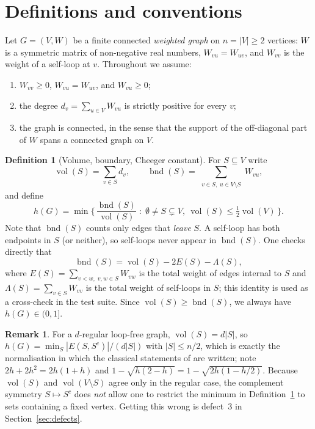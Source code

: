 \documentclass[11pt,a4paper]{article}
\theoremstyle{plain}
\theoremstyle{definition}
\newtheorem{definition}[theorem]{Definition}
\newtheorem{remark}[theorem]{Remark}
\DeclareMathOperator{\vol}{vol}
\DeclareMathOperator{\bnd}{bnd}
\begin{document}
\section{Definitions and conventions}\label{sec:defs}

Let $G=(V,W)$ be a finite connected \emph{weighted graph} on $n=|V|\ge 2$
vertices: $W$ is a symmetric matrix of non-negative real numbers, $W_{vu}=W_{uv}$,
and $W_{vv}$ is the weight of a self-loop at $v$.  Throughout we assume:

\begin{enumerate}[label=(A\arabic*),leftmargin=*,itemsep=1pt]
\item $W_{vv}\ge 0$, $W_{vu}=W_{uv}$, and $W_{vu}\ge 0$;
\item the degree $d_v=\sum_{u\in V}W_{vu}$ is strictly positive for every $v$;
\item the graph is connected, in the sense that the support of the
      off-diagonal part of $W$ spans a connected graph on $V$.
\end{enumerate}

\begin{definition}[Volume, boundary, Cheeger constant]\label{def:cheeger}
For $S\subseteq V$ write
\[
  \vol(S)=\sum_{v\in S} d_v,
  \qquad
  \bnd(S)=\sum_{\substack{v\in S,\; u\in V\setminus S}} W_{vu},
\]
and define
\[
  h(G)=\min\Big\{\, \frac{\bnd(S)}{\vol(S)} \;:\; \emptyset\neq S\subsetneq V,
      \ \vol(S)\le \tfrac{1}{2}\vol(V) \,\Big\}.
\]
Note that $\bnd(S)$ counts only edges that \emph{leave} $S$.  A self-loop has
both endpoints in $S$ (or neither), so self-loops never appear in $\bnd(S)$.
One checks directly that
\begin{equation}\label{eq:identity}
  \bnd(S)=\vol(S)-2E(S)-\Lambda(S),
\end{equation}
where $E(S)=\sum_{v<w,\;v,w\in S}W_{vw}$ is the total weight of edges internal to
$S$ and $\Lambda(S)=\sum_{v\in S}W_{vv}$ is the total weight of self-loops in
$S$; this identity is used as a cross-check in the test suite.  Since
$\vol(S)\ge\bnd(S)$, we always have $h(G)\in(0,1]$.
\end{definition}

\begin{remark}\label{rem:normalisation}
For a $d$-regular loop-free graph, $\vol(S)=d|S|$, so
$h(G)=\min_S|E(S,S^c)|/(d|S|)$ with $|S|\le n/2$, which is exactly the
normalisation in which the classical statements of \cite{chung1997} are written; note $2h+2h^2=2h(1+h)$ and
$1-\sqrt{h(2-h)}=1-\sqrt{2h(1-h/2)}$.  Because $\vol(S)$ and $\vol(V\setminus S)$
agree only in the regular case, the complement symmetry $S\mapsto S^c$ does
\emph{not} allow one to restrict the minimum in Definition~\ref{def:cheeger} to
sets containing a fixed vertex.  Getting this wrong is defect~3 in
Section~\ref{sec:defects}.
\end{remark}
\end{document}
